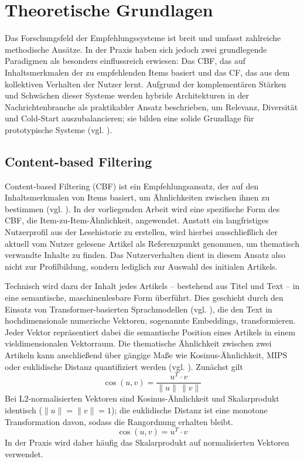 

\section{Theoretische Grundlagen}
Das Forschungsfeld der Empfehlungssysteme ist breit und umfasst zahlreiche methodische
Ansätze. In der Praxis haben sich jedoch zwei grundlegende Paradigmen als besonders einflussreich erwiesen:
Das \ac{CBF}, das auf Inhaltsmerkmalen der zu empfehlenden Items basiert und das \ac{CF}, das aus dem kollektiven
Verhalten der Nutzer lernt. Aufgrund der komplementären Stärken und Schwächen dieser Systeme
werden hybride Architekturen in der Nachrichtenbranche als praktikabler Ansatz beschrieben, 
um Relevanz, Diversität und Cold-Start auszubalancieren; 
sie bilden eine solide Grundlage für prototypische Systeme 
(vgl. \cite{wu_personalized_2022,raza_news_2020}).

\subsection{Content-based Filtering}
\label{sec:cbf}
Content-based Filtering (CBF) ist ein Empfehlungsansatz, der auf den Inhaltsmerkmalen von Items basiert, 
um Ähnlichkeiten zwischen ihnen zu bestimmen (vgl. \cite{Lops_CBRS_SOTA_2011}). In der vorliegenden Arbeit 
wird eine spezifische Form des CBF, die Item-zu-Item-Ähnlichkeit, angewendet. Anstatt ein langfristiges Nutzerprofil 
aus der Lesehistorie zu erstellen, wird hierbei ausschließlich der aktuell 
vom Nutzer gelesene Artikel als Referenzpunkt genommen, um thematisch verwandte Inhalte zu finden. Das Nutzerverhalten 
dient in diesem Ansatz also nicht zur Profilbildung, sondern lediglich zur Auswahl des initialen Artikels.

Technisch wird dazu der Inhalt jedes Artikels – bestehend aus Titel und Text – in eine semantische, 
maschinenlesbare Form überführt. Dies geschieht durch den Einsatz von Transformer-basierten Sprachmodellen 
(vgl. \cite{Vaswani_transformer_2017}), die den Text in hochdimensionale numerische Vektoren, sogenannte Embeddings,
transformieren. Jeder Vektor repräsentiert dabei die semantische Position eines Artikels in einem vieldimensionalen Vektorraum. 
Die thematische Ähnlichkeit zwischen zwei Artikeln kann anschließend über gängige Maße wie Kosinus-Ähnlichkeit, 
\ac{MIPS} oder euklidische Distanz quantifiziert werden (vgl. \Cite{Reimers2019SentenceBERTSE}). Zunächst gilt
\begin{equation}
\label{eq:cosine_similarity}
\cos(u,v) = \frac{u^{T} \cdot v}{\lVert u \rVert \,\lVert v \rVert}
\end{equation}
Bei L2-normalisierten Vektoren sind Kosinus-Ähnlichkeit und Skalarprodukt identisch ($\lVert u \rVert = \lVert v \rVert = 1$); 
die euklidische Distanz ist eine monotone Transformation davon, sodass die Rangordnung erhalten bleibt.
\[
\cos(u,v) = u^{T} \cdot v
\]
In der Praxis wird daher häufig das Skalarprodukt auf normalisierten Vektoren verwendet.


